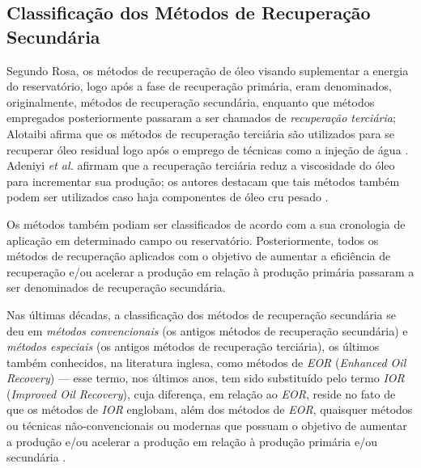 \subsection{Classifica\c{c}\~{a}o dos M\'{e}todos de Recupera\c{c}\~{a}o Secund\'{a}ria}
Segundo Rosa, os m\'{e}todos de recupera\c{c}\~{a}o de \'{o}leo visando suplementar a energia do reservat\'{o}rio, logo ap\'{o}s a fase de recupera\c{c}\~{a}o prim\'{a}ria, eram denominados, originalmente, m\'{e}todos de recupera\c{c}\~{a}o secund\'{a}ria, enquanto que m\'{e}todos empregados posteriormente passaram a ser chamados de \textit{recupera\c{c}\~{a}o terci\'{a}ria}; Alotaibi afirma que os m\'{e}todos de recuperação terciária são utilizados para se recuperar óleo residual logo após o emprego de técnicas como a injeção de água \cite{alotaibi}. Adeniyi \textit{et al.} afirmam que a recuperação terciária reduz a viscosidade do óleo para incrementar sua produção; os autores destacam que tais métodos também podem ser utilizados caso haja componentes de óleo cru pesado \cite{adeniyi2008}. 

Os m\'{e}todos também podiam ser classificados de acordo com a sua cronologia de aplica\c{c}\~{a}o em determinado campo ou reservat\'{o}rio. Posteriormente, todos os m\'{e}todos de recupera\c{c}\~{a}o aplicados com o objetivo de aumentar a efici\^{e}ncia de recupera\c{c}\~{a}o e/ou acelerar a produ\c{c}\~{a}o em rela\c{c}\~{a}o \`{a} produ\c{c}\~{a}o prim\'{a}ria passaram a ser denominados de recupera\c{c}\~{a}o secund\'{a}ria.

Nas \'{u}ltimas d\'{e}cadas, a classifica\c{c}\~{a}o dos m\'{e}todos de recupera\c{c}\~{a}o secund\'{a}ria se deu em \textit{m\'{e}todos convencionais} (os antigos m\'{e}todos de recupera\c{c}\~{a}o secund\'{a}ria) e \textit{m\'{e}todos especiais} (os antigos m\'{e}todos de recupera\c{c}\~{a}o terci\'{a}ria), os \'{u}ltimos tamb\'{e}m conhecidos, na literatura inglesa, como m\'{e}todos de \textit{EOR} (\textit{Enhanced Oil Recovery}) --- esse termo, nos \'{u}ltimos anos, tem sido substitu\'{i}do pelo termo \textit{IOR} (\textit{Improved Oil Recovery}), cuja diferen\c{c}a, em rela\c{c}\~{a}o ao \textit{EOR}, reside no fato de que os m\'{e}todos de \textit{IOR} englobam, al\'{e}m dos m\'{e}todos de \textit{EOR}, quaisquer m\'{e}todos ou t\'{e}cnicas n\~{a}o-convencionais ou modernas que possuam o objetivo de aumentar a produ\c{c}\~{a}o e/ou acelerar a produ\c{c}\~{a}o em rela\c{c}\~{a}o \`{a} produ\c{c}\~{a}o prim\'{a}ria e/ou secund\'{a}ria \cite[p. 564]{engres}. 

